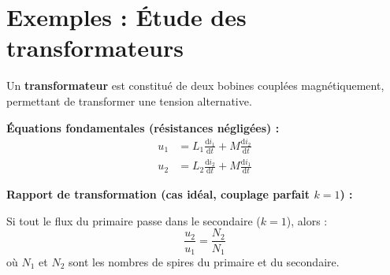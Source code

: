 \documentclass[french]{yLectureNote}
\newcommand{\dd}{\mathrm{d}}
\begin{document}

\section{Exemples : Étude des transformateurs}
\begin{definition}
    Un \textbf{transformateur} est constitué de deux bobines couplées magnétiquement, permettant de transformer une tension alternative.
\end{definition}

\textbf{Équations fondamentales (résistances négligées) :}
\begin{align*}
    u_1 &= L_1 \frac{\dd i_1}{\dd t} + M \frac{\dd i_2}{\dd t} \\
    u_2 &= L_2 \frac{\dd i_2}{\dd t} + M \frac{\dd i_1}{\dd t}
\end{align*}

\textbf{Rapport de transformation (cas idéal, couplage parfait $k=1$) :}
\begin{theorem}
    Si tout le flux du primaire passe dans le secondaire ($k=1$), alors :
    $$
    \frac{u_2}{u_1} = \frac{N_2}{N_1}
    $$
    où $N_1$ et $N_2$ sont les nombres de spires du primaire et du secondaire.
\end{theorem}
\end{document}
